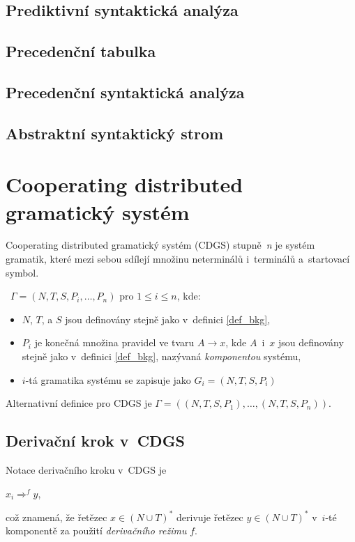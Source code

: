 \section{Prediktivní syntaktická analýza}

\section{Precedenční tabulka}

\section{Precedenční syntaktická analýza}

\section{Abstraktní syntaktický strom}


\chapter{Cooperating distributed gramatický systém}\label{4_CDGS}

Cooperating distributed gramatický systém (CDGS) stupně~\emph{n} je systém gramatik, které mezi sebou sdílejí množinu neterminálů i~terminálů a~startovací symbol.

\begin{definition}
~$\Gamma = (N, T, S, P_i, \ldots ,P_n)$ pro $1 \leq i \leq n$, kde:
\begin{itemize}
    \item $N$, $T$, a $S$ jsou definovány stejně jako v~definici \ref{def_bkg},
    \item $P_i$ je konečná množina pravidel ve tvaru $A\rightarrow x$, kde $A$~i~$x$ jsou definovány stejně jako v~definici \ref{def_bkg}, nazývaná \emph{komponentou} systému,
    \item $i$-tá gramatika systému se zapisuje jako $G_i = (N,T,S,P_i)$
\end{itemize}   
Alternativní definice pro CDGS je $\Gamma = ((N, T, S, P_1), \ldots , (N, T, S, P_n))$.
\end{definition}

\section{Derivační krok v~CDGS}\label{4_1_derivacni_krok}
Notace derivačního kroku v~CDGS je
\begin{center}
    $x_i \Rightarrow^{f} y$,
\end{center}
což znamená, že řetězec $x \in (N \cup T)^{*}$ derivuje řetězec $y \in (N \cup T)^{*}$ v~$i$-té komponentě za použití \emph{derivačního režimu} $f$.

